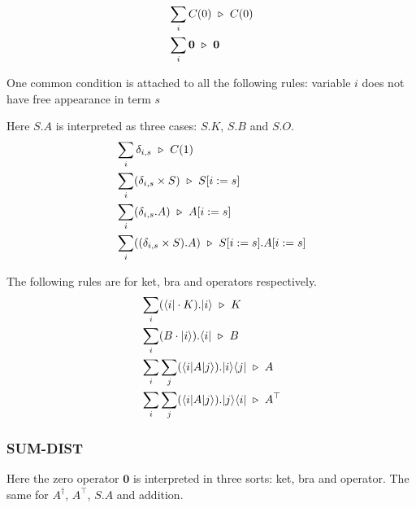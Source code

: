 \begin{align*}
  & \sum_i C(0) \ \triangleright\  C(0) \\
  & \sum_i \mathbf{0} \ \triangleright\  \mathbf{0}
\end{align*}

One common condition is attached to all the following rules: variable $i$ does not have free appearance in term $s$

Here $S.A$ is interpreted as three cases: $S.K$, $S.B$ and $S.O$.
\begin{align*}
  & \sum_i \delta_{i, s} \ \triangleright\  C(1) \\
  & \sum_i (\delta_{i, s} \times S) \ \triangleright\  S[i:=s] \\
  & \sum_i (\delta_{i, s}.A) \ \triangleright\  A[i:=s] \\
  & \sum_i ((\delta_{i, s} \times S).A) \ \triangleright\  S[i:=s].A[i:=s] \\
\end{align*}




The following rules are for ket, bra and operators respectively.
\begin{align*}
  & \sum_i (\langle i| \cdot K).|i\rangle \ \triangleright\  K \\
  & \sum_i (B \cdot |i\rangle).\langle i| \ \triangleright\  B \\
  & \sum_i \sum_j (\langle i| A |j\rangle).|i\rangle\langle j| \ \triangleright\  A \\
  & \sum_i \sum_j (\langle i| A |j\rangle).|j\rangle\langle i| \ \triangleright\  A^\top
\end{align*}


\subsubsection*{\textsf{SUM-DIST}}
Here the zero operator $\mathbf{0}$ is interpreted in three sorts: ket, bra and operator. The same for $A^\dagger$, $A^\top$, $S.A$ and addition.

